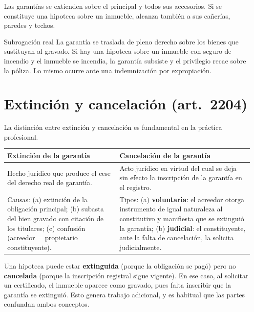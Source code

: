 \documentclass[12pt,oneside]{book}
\begin{document}
Las garantías se extienden sobre el principal y todos sus accesorios. Si se constituye una hipoteca sobre un inmueble, alcanza también a sus cañerías, paredes y techos.

\begin{definition}{Subrogación real}
La garantía se traslada de pleno derecho sobre los bienes que sustituyan al gravado. Si hay una hipoteca sobre un inmueble con seguro de incendio y el inmueble se incendia, la garantía subsiste y el privilegio recae sobre la póliza. Lo mismo ocurre ante una indemnización por expropiación.
\end{definition}

\section{Extinción y cancelación (art.~2204)}

La distinción entre extinción y cancelación es fundamental en la práctica profesional.

\begin{table}[H]
\centering
\begin{tabularx}{\textwidth}{L L}
\toprule
\textbf{Extinción de la garantía} & \textbf{Cancelación de la garantía} \\
\midrule
Hecho jurídico que produce el cese del derecho real de garantía. &
Acto jurídico en virtud del cual se deja sin efecto la inscripción de la garantía en el registro. \\
\addlinespace
Causas: (a) extinción de la obligación principal; (b) subasta del bien gravado con citación de los titulares; (c) confusión (acreedor = propietario constituyente). &
Tipos: (a) \textbf{voluntaria}: el acreedor otorga instrumento de igual naturaleza al constitutivo y manifiesta que se extinguió la garantía; (b) \textbf{judicial}: el constituyente, ante la falta de cancelación, la solicita judicialmente. \\
\bottomrule
\end{tabularx}
\end{table}

\begin{important}
Una hipoteca puede estar \textbf{extinguida} (porque la obligación se pagó) pero no \textbf{cancelada} (porque la inscripción registral sigue vigente). En ese caso, al solicitar un certificado, el inmueble aparece como gravado, pues falta inscribir que la garantía se extinguió. Esto genera trabajo adicional, y es habitual que las partes confundan ambos conceptos.
\end{important}
\end{document}
